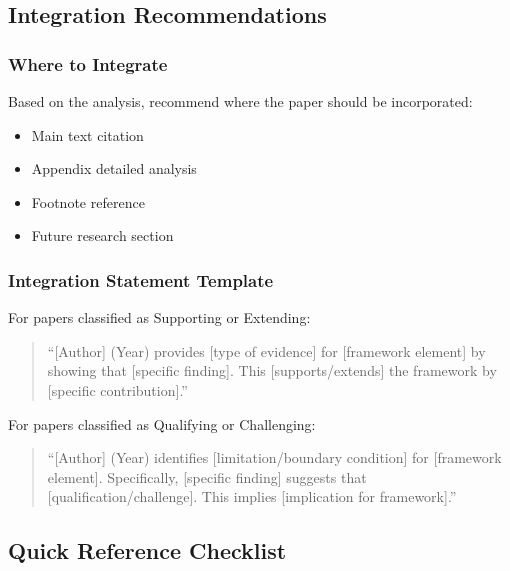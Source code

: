 \documentclass[12pt,a4paper]{article}
\begin{document}
\subsection{Integration Recommendations}

\subsubsection{Where to Integrate}

Based on the analysis, recommend where the paper should be incorporated:
\begin{itemize}
  \item Main text citation
  \item Appendix detailed analysis
  \item Footnote reference
  \item Future research section
\end{itemize}

\subsubsection{Integration Statement Template}

For papers classified as Supporting or Extending:
\begin{quote}
``[Author] (Year) provides [type of evidence] for [framework element] by showing that 
[specific finding]. This [supports/extends] the framework by [specific contribution].''
\end{quote}

For papers classified as Qualifying or Challenging:
\begin{quote}
``[Author] (Year) identifies [limitation/boundary condition] for [framework element]. 
Specifically, [specific finding] suggests that [qualification/challenge]. 
This implies [implication for framework].''
\end{quote}

\subsection{Quick Reference Checklist}
\end{document}
